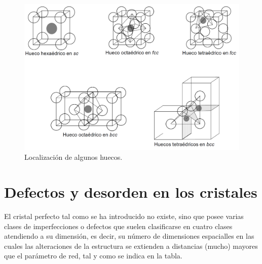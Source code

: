 \begin{figure}[h!] \centering
    \includegraphics[scale=0.4]{Cuerpo/Ch_01/huecos.png}
    \caption{Localización de algunos huecos.}
    \label{Fig:01-05}
\end{figure}


\section{Defectos y desorden en los cristales}

El cristal perfecto tal como se ha introducido no existe, sino que posee varias clases de imperfecciones o defectos que suelen clasificarse en cuatro clases atendiendo a su dimensión, es decir, su número de dimensiones espacialles en las cuales las alteraciones de la estructura se extienden a distancias (mucho) mayores que el parámetro de red, tal y como se indica en la tabla.


